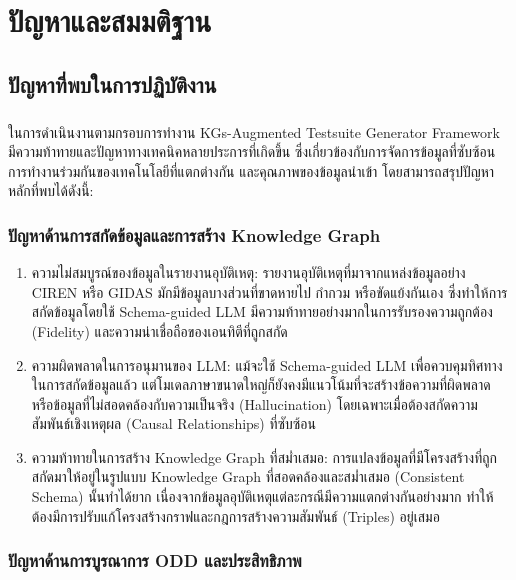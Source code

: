 \chapter{ปัญหาและสมมติฐาน}\label{ch:problems-hypotheses}

\section{ปัญหาที่พบในการปฏิบัติงาน}\label{sec:problems}
\paragraph{}

ในการดำเนินงานตามกรอบการทำงาน KGs-Augmented Testsuite Generator Framework มีความท้าทายและปัญหาทางเทคนิคหลายประการที่เกิดขึ้น ซึ่งเกี่ยวข้องกับการจัดการข้อมูลที่ซับซ้อน การทำงานร่วมกันของเทคโนโลยีที่แตกต่างกัน และคุณภาพของข้อมูลนำเข้า โดยสามารถสรุปปัญหาหลักที่พบได้ดังนี้:

\subsection{ปัญหาด้านการสกัดข้อมูลและการสร้าง Knowledge Graph}\label{subsec:data-extraction-kg}

\begin{enumerate}
    \item ความไม่สมบูรณ์ของข้อมูลในรายงานอุบัติเหตุ: รายงานอุบัติเหตุที่มาจากแหล่งข้อมูลอย่าง CIREN หรือ GIDAS มักมีข้อมูลบางส่วนที่ขาดหายไป กำกวม หรือขัดแย้งกันเอง ซึ่งทำให้การสกัดข้อมูลโดยใช้ Schema-guided LLM มีความท้าทายอย่างมากในการรับรองความถูกต้อง (Fidelity) และความน่าเชื่อถือของเอนทิตีที่ถูกสกัด
    \item ความผิดพลาดในการอนุมานของ LLM: แม้จะใช้ Schema-guided LLM เพื่อควบคุมทิศทางในการสกัดข้อมูลแล้ว แต่โมเดลภาษาขนาดใหญ่ก็ยังคงมีแนวโน้มที่จะสร้างข้อความที่ผิดพลาดหรือข้อมูลที่ไม่สอดคล้องกับความเป็นจริง (Hallucination) โดยเฉพาะเมื่อต้องสกัดความสัมพันธ์เชิงเหตุผล (Causal Relationships) ที่ซับซ้อน
    \item ความท้าทายในการสร้าง Knowledge Graph ที่สม่ำเสมอ: การแปลงข้อมูลที่มีโครงสร้างที่ถูกสกัดมาให้อยู่ในรูปแบบ Knowledge Graph ที่สอดคล้องและสม่ำเสมอ (Consistent Schema) นั้นทำได้ยาก เนื่องจากข้อมูลอุบัติเหตุแต่ละกรณีมีความแตกต่างกันอย่างมาก ทำให้ต้องมีการปรับแก้โครงสร้างกราฟและกฎการสร้างความสัมพันธ์ (Triples) อยู่เสมอ
\end{enumerate}

\subsection{ปัญหาด้านการบูรณาการ ODD และประสิทธิภาพ}\label{subsec:odd-integration-performance}

